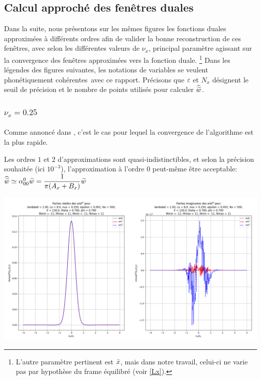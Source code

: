 \subsection{Calcul approché des fenêtres duales}


Dans la suite, nous présentons sur les mêmes figures les fonctions duales approximées à différents ordres
afin de valider la bonne reconstruction de ces fenêtres, avec selon les différentes valeurs de $\nu_x$,
principal paramètre agissant sur la convergence des fenêtres approximées vers la fonction duale.
\footnote{L'autre paramètre pertinent est $\bar{x}$, mais dans notre travail,
celui-ci ne varie pas par hypothèse du frame équilibré (voir \eqref{Lx}).}
Dans les légendes des figures suivantes,
les notations de variables se veulent \og phonétiquement cohérentes\fg\ avec ce rapport.
Précisons que $\varepsilon$ et $N_x$ désignent le seuil de précision
et le nombre de points utilisés pour calculer $\widehat{\widetilde{w}}$.


\subsubsection{$\nu_x = 0.25$}


\paragraph{}

Comme annoncé dans \cite{TheseLugara}, c'est le cas pour lequel la convergence de l'algorithme est la plus rapide.

Les ordres $1$ et $2$ d'approximations sont quasi-indistinctibles, et selon la précision souhaitée (ici $10^{-3}$),
l'approximation à l'ordre $0$ peut-même être acceptable: $\h{\t{w}}\simeq\alpha_{00}^0\t{w}=\f[1]{\pi(A_x+B_x)}\t{w}$

\includegraphics[scale=0.35]{1.png}

